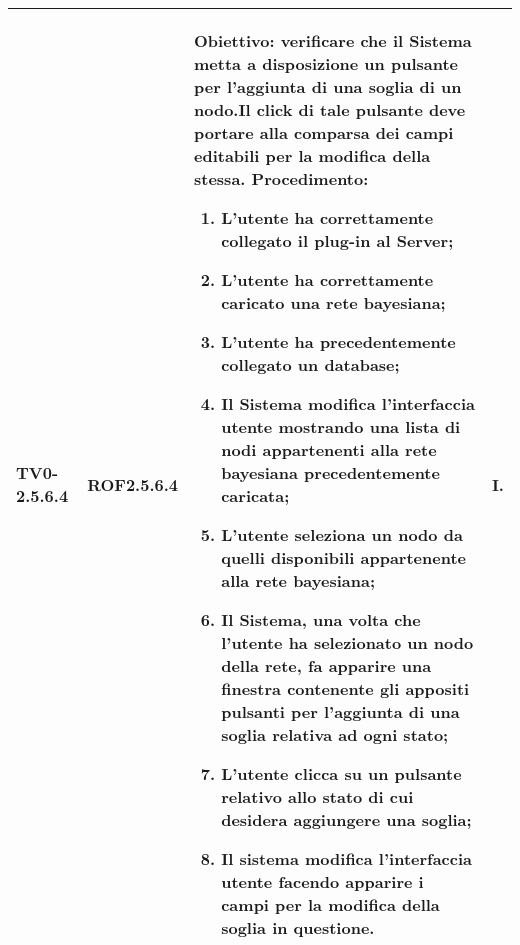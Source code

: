 \begin{longtable}{|C{.15\textwidth}|C{.13\textwidth}|m{.52\textwidth}|C{.08\textwidth}|}
TV0-2.5.6.4 & ROF2.5.6.4  &
	\textbf{Obiettivo}: verificare che il Sistema metta a disposizione un pulsante per l'aggiunta di una soglia di un nodo.Il click di tale pulsante deve portare alla comparsa dei campi editabili per la modifica della stessa. \newline
	\textbf{Procedimento}:
	\begin{enumerate}
		\item L'utente ha correttamente collegato il plug-in al Server;
		\item L'utente ha correttamente caricato una rete bayesiana;
		\item L'utente ha precedentemente collegato un database;
		\item Il Sistema modifica l'interfaccia utente mostrando una lista di nodi appartenenti alla rete bayesiana precedentemente caricata;
		\item L'utente seleziona un nodo da quelli disponibili appartenente alla rete bayesiana;
		\item Il Sistema, una volta che l'utente ha selezionato un nodo della rete, fa apparire una finestra contenente gli appositi pulsanti per l'aggiunta di una soglia relativa ad ogni stato;
		\item L'utente clicca su un pulsante relativo allo stato di cui desidera aggiungere una soglia;
		\item Il sistema modifica l'interfaccia utente facendo apparire i campi per la modifica della soglia in questione.
	\end{enumerate}
	& I. \\
\hline


\end{longtable}
